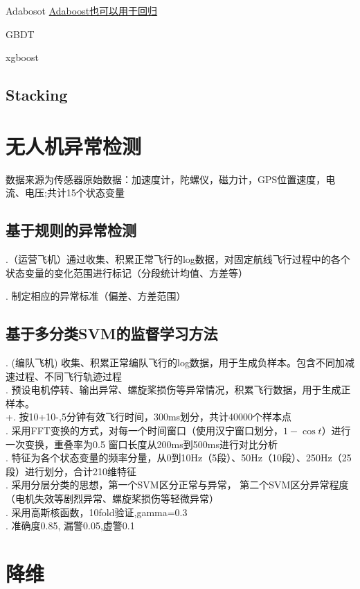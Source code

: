 Adabosot
\href{http://sofasofa.io/forum_main_post.php?postid=1003214}{Adaboost也可以用于回归}

GBDT

xgboost

\subsection{Stacking}


\section{无人机异常检测}
数据来源为传感器原始数据：加速度计，陀螺仪，磁力计，GPS位置速度，电流、电压;共计15个状态变量

\subsection{基于规则的异常检测}
.（运营飞机）通过收集、积累正常飞行的log数据，对固定航线飞行过程中的各个状态变量的变化范围进行标记（分段统计均值、方差等）

. 制定相应的异常标准（偏差、方差范围） 

\subsection{基于多分类SVM的监督学习方法}
. (编队飞机) 收集、积累正常编队飞行的log数据，用于生成负样本。包含不同加减速过程、不同飞行轨迹过程 \\
. 预设电机停转、输出异常、螺旋桨损伤等异常情况，积累飞行数据，用于生成正样本。 \\
+. 按10+10-,5分钟有效飞行时间，300ms划分，共计40000个样本点 \\
. 采用FFT变换的方式，对每一个时间窗口（使用汉宁窗口划分，$1 - \cos t$）进行一次变换，重叠率为0.5
窗口长度从200ms到500ms进行对比分析 \\
. 特征为各个状态变量的频率分量，从0到10Hz（5段）、50Hz（10段）、250Hz（25段）进行划分，合计210维特征 \\
. 采用分层分类的思想，第一个SVM区分正常与异常， 第二个SVM区分异常程度（电机失效等剧烈异常、螺旋桨损伤等轻微异常） \\
. 采用高斯核函数，10fold验证,gamma=0.3 \\
. 准确度0.85, 漏警0.05,虚警0.1

\section{降维}
